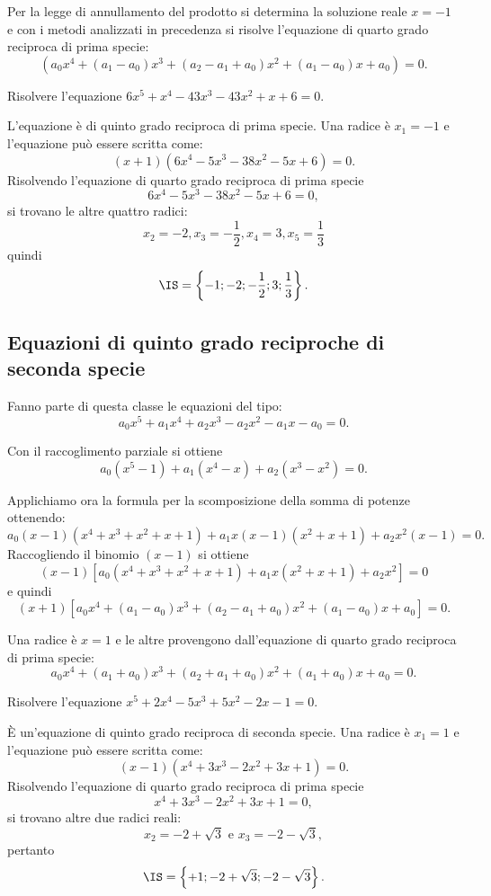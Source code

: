 Per la legge di annullamento del prodotto si determina la soluzione reale $x=-1$ e con i metodi analizzati in precedenza si risolve l’equazione di quarto grado reciproca di prima specie: 
\[\left(a_0x^4+(a_1-a_0)x^3+(a_2-a_1+a_0)x^2+(a_1-a_0)x+a_0\right)=0.\]
\begin{exrig}
 \begin{esempio}
 Risolvere l'equazione $6x^5+x^4-43x^3-43x^2+x+6=0$.

 L’equazione è di quinto grado reciproca di prima specie. Una radice è $x_1=-1$ e l’equazione può essere scritta come: 
\[(x+1)\left(6x^4-5x^3-38x^2-5x+6\right)=0.\]
 Risolvendo l’equazione di quarto grado reciproca di prima specie 
\[6x^4-5x^3-38x^2-5x+6=0,\] 
si trovano le altre quattro radici: 
\[x_2=-2, x_3=-\frac 1 2, x_4=3, x_5=\frac{1}{3}\] quindi 
\[\IS=\left\{-1;-2;-\frac 1 2;3;\frac 1 3\right\}.\]
 \end{esempio}
\end{exrig}

\subsection{Equazioni di quinto grado reciproche di seconda specie}
Fanno parte di questa classe le equazioni del tipo:
\[a_0x^5+a_1x^4+a_2x^3-a_2x^2-a_1x-a_0=0.\]

Con il raccoglimento parziale si ottiene 
\[a_0\left(x^5-1\right)+a_1\left(x^4-x\right)+a_2\left(x^3-x^2\right)=0.\]

 Applichiamo ora la formula per la scomposizione della somma di potenze ottenendo: 
\[a_0(x-1)\left(x^4+x^3+x^2+x+1\right)+a_1x(x-1)\left(x^2+x+1\right)+a_2x^2(x-1)=0.\] 
Raccogliendo il binomio $(x-1)$ si ottiene 
\[(x-1)\left[a_0\left(x^4+x^3+x^2+x+1\right)+a_1x\left(x^2+x+1\right)+a_2x^2\right]=0\] e quindi 
\[(x+1)\left[a_0x^4+(a_1-a_0)x^3+(a_2-a_1+a_0)x^2+(a_1-a_0)x+a_0\right]=0.\]

Una radice è $x=1$ e le altre provengono dall’equazione di quarto grado reciproca di prima specie: \[a_0x^4+(a_1+a_0)x^3+(a_2+a_1+a_0)x^2+(a_1+a_0)x+a_0=0.\]
\begin{exrig}
 \begin{esempio}
 Risolvere l'equazione $x^5+2x^4-5x^3+5x^2-2x-1=0$.

 È un’equazione di quinto grado reciproca di seconda specie. Una radice è $x_1=1$ e l'equazione può essere scritta come: 
\[(x-1)\left(x^4+3x^3-2x^2+3x+1\right)=0.\] 
Risolvendo l’equazione di quarto grado reciproca di prima specie 
\[x^4+3x^3-2x^2+3x+1=0,\] si trovano altre due radici reali: 
\[x_2=-2+\sqrt 3\text{ e }x_3=-2-\sqrt 3,\] 
pertanto 
\[\IS=\left\{+1;-2+\sqrt 3;-2-\sqrt 3\right\}.\]
 \end{esempio}
\end{exrig}

